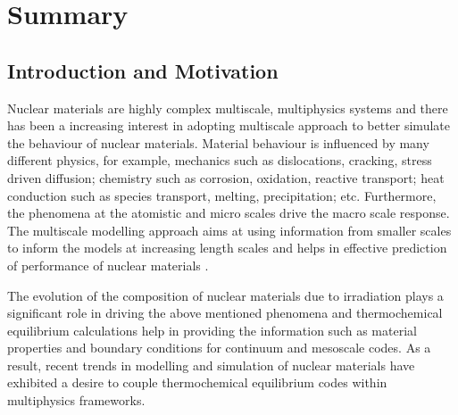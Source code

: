 \chapter*{Summary}


\section*{Introduction and Motivation}
Nuclear materials are highly complex multiscale, multiphysics systems and there has been a increasing interest in adopting multiscale approach to better simulate the behaviour of nuclear materials. Material behaviour is influenced by many different physics, for example, mechanics such as dislocations, cracking, stress driven diffusion; chemistry such as corrosion, oxidation, reactive transport; heat conduction such as species transport, melting, precipitation; etc. Furthermore, the phenomena at the atomistic and micro scales drive the macro scale response. The multiscale modelling approach aims at using information from smaller scales to inform the models at increasing length scales and helps in effective prediction of performance of nuclear materials \cite{STAN200920}.

The evolution of the composition of nuclear materials due to irradiation plays a significant role in driving the above mentioned phenomena and thermochemical equilibrium calculations help in providing the information such as material properties and boundary conditions for continuum and mesoscale codes. As a result, recent trends in modelling and simulation of nuclear materials have exhibited a desire to couple thermochemical equilibrium codes within multiphysics frameworks.

